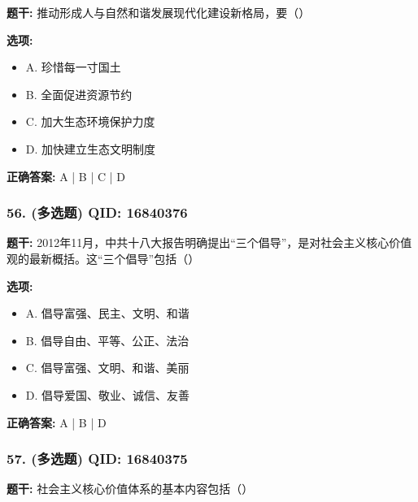 \documentclass[12pt,UTF8]{ctexart}
\begin{document}
\textbf{题干:}
推动形成人与自然和谐发展现代化建设新格局，要（）

\textbf{选项:}
\begin{itemize}[leftmargin=*]

  \item A. 珍惜每一寸国土

  \item B. 全面促进资源节约

  \item C. 加大生态环境保护力度

  \item D. 加快建立生态文明制度

\end{itemize}

\textbf{正确答案:}
A | B | C | D

\vspace{0.3em}\hrulefill\vspace{0.7em}

\subsubsection*{56. (多选题) \small QID: 16840376}

\textbf{题干:}
2012年11月，中共十八大报告明确提出“三个倡导”，是对社会主义核心价值观的最新概括。这“三个倡导”包括（）

\textbf{选项:}
\begin{itemize}[leftmargin=*]

  \item A. 倡导富强、民主、文明、和谐

  \item B. 倡导自由、平等、公正、法治

  \item C. 倡导富强、文明、和谐、美丽

  \item D. 倡导爱国、敬业、诚信、友善

\end{itemize}

\textbf{正确答案:}
A | B | D

\vspace{0.3em}\hrulefill\vspace{0.7em}

\subsubsection*{57. (多选题) \small QID: 16840375}

\textbf{题干:}
社会主义核心价值体系的基本内容包括（）
\end{document}
